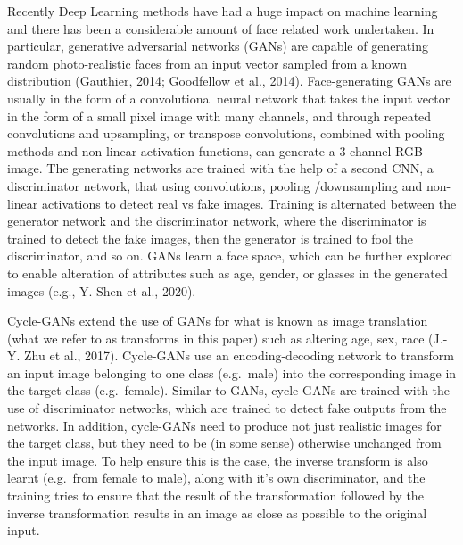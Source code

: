 \documentclass[
  doc,floatsintext]{apa6}
\begin{document}
Recently Deep Learning methods have had a huge impact on machine learning and there has been a considerable amount of face related work undertaken. In particular, generative adversarial networks (GANs) are capable of generating random photo-realistic faces from an input vector sampled from a known distribution (Gauthier, 2014; Goodfellow et al., 2014). Face-generating GANs are usually in the form of a convolutional neural network that takes the input vector in the form of a small pixel image with many channels, and through repeated convolutions and upsampling, or transpose convolutions, combined with pooling methods and non-linear activation functions, can generate a 3-channel RGB image. The generating networks are trained with the help of a second CNN, a discriminator network, that using convolutions, pooling /downsampling and non-linear activations to detect real vs fake images. Training is alternated between the generator network and the discriminator network, where the discriminator is trained to detect the fake images, then the generator is trained to fool the discriminator, and so on. GANs learn a face space, which can be further explored to enable alteration of attributes such as age, gender, or glasses in the generated images (e.g., Y. Shen et al., 2020).

Cycle-GANs extend the use of GANs for what is known as image translation (what we refer to as transforms in this paper) such as altering age, sex, race (J.-Y. Zhu et al., 2017). Cycle-GANs use an encoding-decoding network to transform an input image belonging to one class (e.g.~male) into the corresponding image in the target class (e.g.~female). Similar to GANs, cycle-GANs are trained with the use of discriminator networks, which are trained to detect fake outputs from the networks. In addition, cycle-GANs need to produce not just realistic images for the target class, but they need to be (in some sense) otherwise unchanged from the input image. To help ensure this is the case, the inverse transform is also learnt (e.g.~from female to male), along with it's own discriminator, and the training tries to ensure that the result of the transformation followed by the inverse transformation results in an image as close as possible to the original input.
\end{document}
